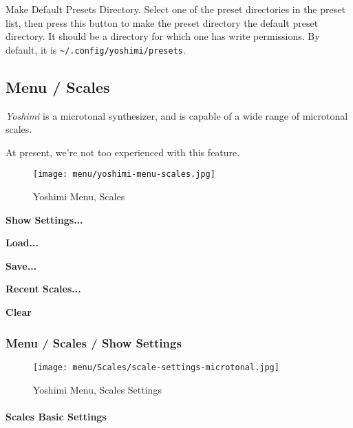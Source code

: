    Make Default Presets Directory.
   Select one of the preset directories in the preset list, then press this
   button to make the preset directory the default preset directory.
   It should be a directory for which one has write permissions.
   By default, it is \texttt{\textasciitilde/.config/yoshimi/presets}.

\subsection{Menu / Scales}
\label{subsec:menu_scales}

   \textsl{Yoshimi} is a microtonal synthesizer, and is capable of a wide
   range of microtonal scales.

   At present, we're not too experienced with this feature.

\begin{figure}[H]
   \centering 
   \texttt{[image: menu/yoshimi-menu-scales.jpg]}
   \caption{Yoshimi Menu, Scales}
   \label{fig:yoshimi_menu_scales}
\end{figure}

   \begin{enumber}
      \item \textbf{Show Settings...}
      \item \textbf{Load...}
      \item \textbf{Save...}
      \item \textbf{Recent Scales...}
      \item \textbf{Clear}
   \end{enumber}

\subsubsection{Menu / Scales / Show Settings}
\label{subsec:menu_scales_show}

\begin{figure}[H]
   \centering 
   \texttt{[image: menu/Scales/scale-settings-microtonal.jpg]}
   \caption{Yoshimi Menu, Scales Settings}
   \label{fig:yoshimi_menu_scales_settings}
\end{figure}

\paragraph{Scales Basic Settings}
\label{paragraph:menu_scales_basic_settings}

